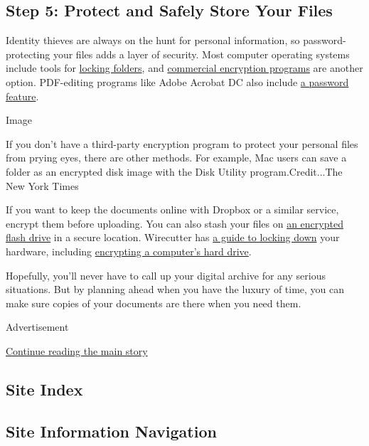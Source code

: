 \hypertarget{step-5-protect-and-safely-store-your-files}{%
\subsection{Step 5: Protect and Safely Store Your
Files}\label{step-5-protect-and-safely-store-your-files}}

Identity thieves are always on the hunt for personal information, so
password-protecting your files adds a layer of security. Most computer
operating systems include tools for
\href{https://www.digitaltrends.com/computing/how-to-password-protect-folder/}{locking
folders}, and
\href{https://www.pcmag.com/picks/the-best-encryption-software}{commercial
encryption programs} are another option. PDF-editing programs like Adobe
Acrobat DC also include
\href{https://helpx.adobe.com/acrobat/using/securing-pdfs-passwords.html}{a
password feature}.

Image

If you don't have a third-party encryption program to protect your
personal files from prying eyes, there are other methods. For example,
Mac users can save a folder as an encrypted disk image with the Disk
Utility program.Credit...The New York Times

If you want to keep the documents online with Dropbox or a similar
service, encrypt them before uploading. You can also stash your files on
\href{https://us.norton.com/internetsecurity-how-to-encrypt-a-flash-drive.html}{an
encrypted flash drive} in a secure location. Wirecutter has
\href{https://thewirecutter.com/blog/track-encrypt-phone-laptop-traveling/}{a
guide to locking down} your hardware, including
\href{https://www.nytimes3xbfgragh.onion/2018/03/13/smarter-living/how-to-encrypt-your-computers-data.html}{encrypting
a computer's hard drive}.

Hopefully, you'll never have to call up your digital archive for any
serious situations. But by planning ahead when you have the luxury of
time, you can make sure copies of your documents are there when you need
them.

Advertisement

\protect\hyperlink{after-bottom}{Continue reading the main story}

\hypertarget{site-index}{%
\subsection{Site Index}\label{site-index}}

\hypertarget{site-information-navigation}{%
\subsection{Site Information
Navigation}\label{site-information-navigation}}

